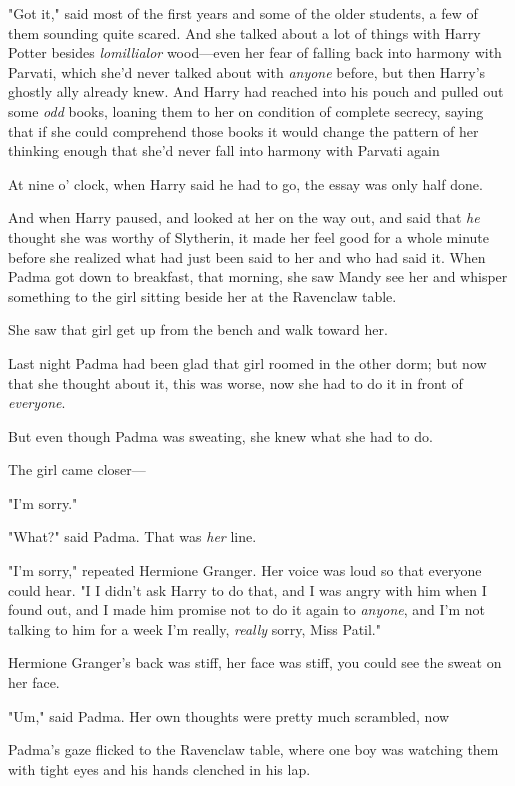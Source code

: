 "Got it," said most of the first years and some of the older students, a few of
them sounding quite scared.
\sbreak
And she talked about a lot of things with Harry Potter besides
\emph{lomillialor} wood—even her fear of falling back into harmony with
Parvati, which she'd never talked about with \emph{anyone} before, but then
Harry's ghostly ally already knew. And Harry had reached into his pouch and
pulled out some \emph{odd} books, loaning them to her on condition of complete
secrecy, saying that if she could comprehend those books it would change the
pattern of her thinking enough that she'd never fall into harmony with Parvati
again{\el}

At nine o' clock, when Harry said he had to go, the essay was only half done.

And when Harry paused, and looked at her on the way out, and said that
\emph{he} thought she was worthy of Slytherin, it made her feel good for a
whole minute before she realized what had just been said to her and who had
said it.
\sbreak
When Padma got down to breakfast, that morning, she saw Mandy see her and
whisper something to the girl sitting beside her at the Ravenclaw table.

She saw that girl get up from the bench and walk toward her.

Last night Padma had been glad that girl roomed in the other dorm; but now that
she thought about it, this was worse, now she had to do it in front of
\emph{everyone}.

But even though Padma was sweating, she knew what she had to do.

The girl came closer—

"I'm sorry."

"What?" said Padma. That was \emph{her} line.

"I'm sorry," repeated Hermione Granger. Her voice was loud so that everyone
could hear. "I{\el} I didn't ask Harry to do that, and I was angry with him
when I found out, and I made him promise not to do it again to \emph{anyone},
and I'm not talking to him for a week{\el} I'm really, \emph{really} sorry,
Miss Patil."

Hermione Granger's back was stiff, her face was stiff, you could see the sweat
on her face.

"Um," said Padma. Her own thoughts were pretty much scrambled, now{\el}

Padma's gaze flicked to the Ravenclaw table, where one boy was watching them
with tight eyes and his hands clenched in his lap.
\sbreak
\vspace{-2\baselineskip}
